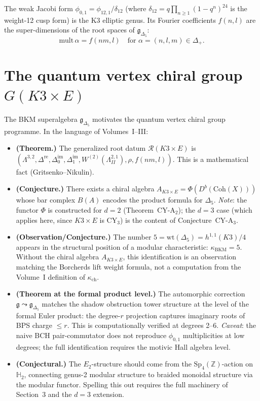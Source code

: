 The weak Jacobi form $\phi_{0,1} = \phi_{12,1}/\delta_{12}$ (where $\delta_{12} = q \prod_{n \geq 1} (1 - q^n)^{24}$ is the weight-12 cusp form) is the K3 elliptic genus. Its Fourier coefficients $f(n,l)$ are the super-dimensions of the root spaces of $\mathfrak{g}_{\Delta_5}$:
\[
 \mathrm{mult}\, \alpha = f(nm, l) \quad \text{for } \alpha = (n,l,m) \in \Delta_+.
\]

\section{The quantum vertex chiral group $G(K3 \times E)$}
\label{sec:k3e-qvcg}

The BKM superalgebra $\mathfrak{g}_{\Delta_5}$ motivates the quantum vertex chiral group programme. In the language of Volumes~I--III:

\begin{itemize}
 \item \textbf{(Theorem.)} The generalized root datum $\mathcal{R}(K3 \times E)$ is $(\Lambda^{3,2}, \Delta^{\mathrm{re}}, \Delta^{\mathrm{im}}_0, \Delta^{\mathrm{im}}_1, W^{(2)}(\Lambda^{2,1}_{II}), \rho, f(nm,l))$. This is a mathematical fact (Gritsenko--Nikulin).
 \item \textbf{(Conjecture.)} There exists a chiral algebra $A_{K3 \times E} = \Phi(D^b(\mathrm{Coh}(X)))$ whose bar complex $B(A)$ encodes the product formula for $\Delta_5$. \emph{Note}: the functor $\Phi$ is constructed for $d = 2$ (Theorem~CY-A$_2$); the $d = 3$ case (which applies here, since $K3 \times E$ is CY$_3$) is the content of Conjecture~CY-A$_3$.
 \item \textbf{(Observation/Conjecture.)} The number $5 = \mathrm{wt}(\Delta_5) = h^{1,1}(K3)/4$ appears in the structural position of a modular characteristic: $\kappa_{\mathrm{BKM}} = 5$. Without the chiral algebra $A_{K3 \times E}$, this identification is an observation matching the Borcherds lift weight formula, not a computation from the Volume~I definition of $\kappa_{\mathrm{ch}}$.
 \item \textbf{(Theorem at the formal product level.)} The automorphic correction $\mathfrak{g} \leadsto \mathfrak{g}_{\Delta_5}$ matches the shadow obstruction tower structure at the level of the formal Euler product: the degree-$r$ projection captures imaginary roots of BPS charge $\leq r$. This is computationally verified at degrees 2--6. \emph{Caveat}: the naive BCH pair-commutator does not reproduce $\phi_{0,1}$ multiplicities at low degrees; the full identification requires the motivic Hall algebra level.
 \item \textbf{(Conjectural.)} The $E_2$-structure should come from the $\mathrm{Sp}_4(\mathbb{Z})$-action on $\mathbb{H}_2$, connecting genus-2 modular structure to braided monoidal structure via the modular functor. Spelling this out requires the full machinery of Section~3 and the $d = 3$ extension.
\end{itemize}

